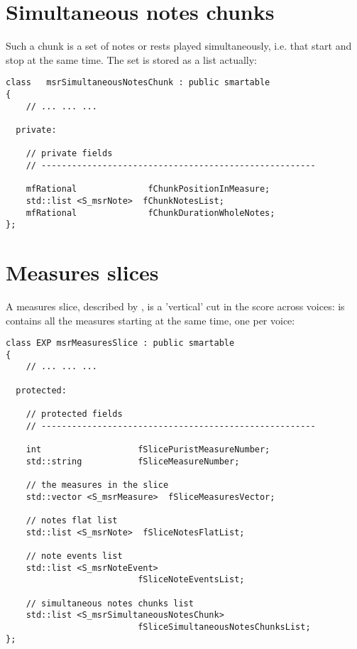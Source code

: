 \section{Simultaneous notes chunks}

Such a chunk is a set of notes or rests played simultaneously, i.e. that start and stop at the same time. The set is stored as a list actually:
\begin{lstlisting}[language=CPlusPlus]
class   msrSimultaneousNotesChunk : public smartable
{
	// ... ... ...

  private:

    // private fields
    // ------------------------------------------------------

    mfRational              fChunkPositionInMeasure;
    std::list <S_msrNote>  fChunkNotesList;
    mfRational              fChunkDurationWholeNotes;
};
\end{lstlisting}


\section{Measures slices}

A measures slice, described by , is a 'vertical' cut in the score across voices: is contains all the measures starting at the same time, one per voice:
\begin{lstlisting}[language=CPlusPlus]
class EXP msrMeasuresSlice : public smartable
{
	// ... ... ...

  protected:

    // protected fields
    // ------------------------------------------------------

    int                   fSlicePuristMeasureNumber;
    std::string           fSliceMeasureNumber;

    // the measures in the slice
    std::vector <S_msrMeasure>  fSliceMeasuresVector;

    // notes flat list
    std::list <S_msrNote>  fSliceNotesFlatList;

    // note events list
    std::list <S_msrNoteEvent>
                          fSliceNoteEventsList;

    // simultaneous notes chunks list
    std::list <S_msrSimultaneousNotesChunk>
                          fSliceSimultaneousNotesChunksList;
};

\end{lstlisting}


